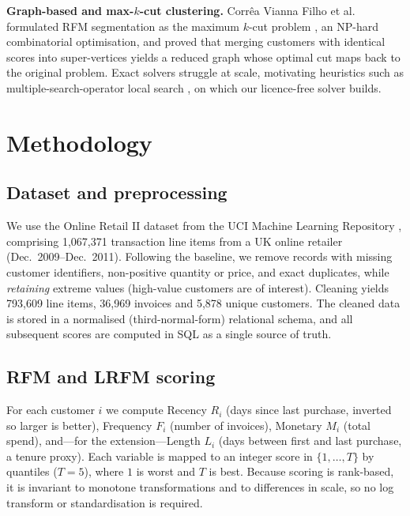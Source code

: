 \documentclass[pdflatex,sn-mathphys-num]{sn-jnl}%
\begin{document}
\noindent\textbf{Graph-based and max-$k$-cut clustering.} Corr\^ea Vianna Filho et al.\ \cite{vianna2026} formulated RFM segmentation as the maximum $k$-cut problem \cite{vandam2016}, an NP-hard combinatorial optimisation, and proved that merging customers with identical scores into super-vertices yields a reduced graph whose optimal cut maps back to the original problem. Exact solvers struggle at scale, motivating heuristics such as multiple-search-operator local search \cite{mahao2017}, on which our licence-free solver builds.

\section{Methodology}\label{sec:method}

\subsection{Dataset and preprocessing}\label{subsec:data}
We use the Online Retail II dataset from the UCI Machine Learning Repository \cite{onlineretail2019}, comprising 1{,}067{,}371 transaction line items from a UK online retailer (Dec.\ 2009--Dec.\ 2011). Following the baseline, we remove records with missing customer identifiers, non-positive quantity or price, and exact duplicates, while \emph{retaining} extreme values (high-value customers are of interest). Cleaning yields 793{,}609 line items, 36{,}969 invoices and 5{,}878 unique customers. The cleaned data is stored in a normalised (third-normal-form) relational schema, and all subsequent scores are computed in SQL as a single source of truth.

\subsection{RFM and LRFM scoring}\label{subsec:scoring}
For each customer $i$ we compute Recency $R_i$ (days since last purchase, inverted so larger is better), Frequency $F_i$ (number of invoices), Monetary $M_i$ (total spend), and---for the extension---Length $L_i$ (days between first and last purchase, a tenure proxy). Each variable is mapped to an integer score in $\{1,\dots,T\}$ by quantiles ($T=5$), where $1$ is worst and $T$ is best. Because scoring is rank-based, it is invariant to monotone transformations and to differences in scale, so no log transform or standardisation is required.
\end{document}

